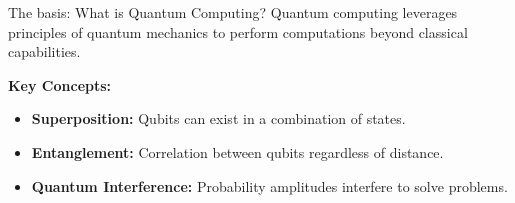 \documentclass{beamer}
\begin{document}
\begin{frame}{The basis: What is Quantum Computing?}
Quantum computing leverages principles of quantum mechanics to perform computations beyond classical capabilities.

\vspace{10pt}
\textbf{Key Concepts:}
\begin{itemize}
\item \textbf{Superposition:} Qubits can exist in a combination of states.
\item \textbf{Entanglement:} Correlation between qubits regardless of distance.
\item \textbf{Quantum Interference:} Probability amplitudes interfere to solve problems.
\end{itemize}

\end{frame}
\end{document}
